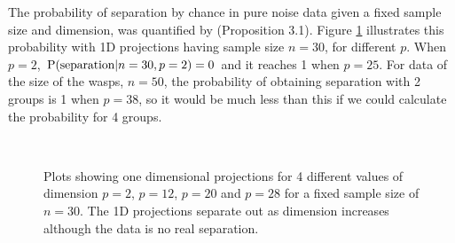 The probability of separation by chance in pure noise data given a fixed sample size and dimension,  was quantified by \cite{ripley:1996} (Proposition 3.1). Figure \ref{dist_1d} illustrates this probability with 1D projections having sample size $n = 30$, for different $p$. When $p = 2$, $\hbox{P(separation}|n = 30, p = 2) = 0$ and it reaches 1 when $p = 25$. For data of the size of the wasps, $n = 50$, the probability of obtaining separation with 2 groups is 1 when $p = 38$, so it would be much less than this if we could calculate the probability for 4 groups.

\begin{figure}[htbp]
\centering
\mbox{\quad
{}\quad
{}\quad
{}}
\caption{Plots showing one dimensional projections for 4 different values of dimension $p=2$, $p=12$, $p=20$ and $p=28$ for a fixed sample size of $n = 30$. The 1D projections separate out as dimension increases although the data is no real separation.  } 
\label{dist_1d}
\end{figure}


